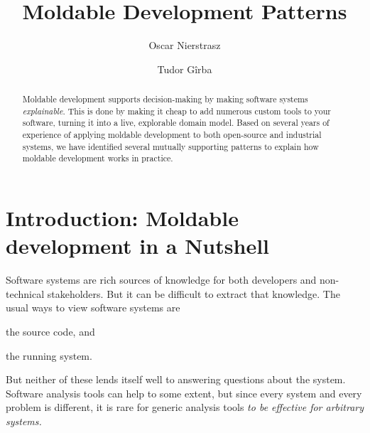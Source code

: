 \documentclass[sigconf]{acmart}
\begin{document}
\title[Moldable Development Patterns --- DRAFT]{Moldable Development Patterns}

\author{Oscar Nierstrasz}

\author{Tudor G\^irba}

\renewcommand{\shortauthors}{Nierstrasz and G\^irba} %

\begin{abstract}
Moldable development supports decision-making by making software systems \emph{explainable}.
This is done by making it cheap to add numerous custom tools to your software, turning it into a live, explorable domain model.
Based on several years of experience of applying moldable development to both open-source and industrial systems, we have identified several mutually supporting patterns to explain how moldable development works in practice.
\end{abstract}


\maketitle

\section{Introduction: Moldable development in a Nutshell}

Software systems are rich sources of knowledge for both developers and non-technical stakeholders.
But it can be difficult to extract that knowledge.
The usual ways to view software systems are
\begin{inparaenum}[(i)]
\item the source code, and
\item the running system.
\end{inparaenum}
But neither of these lends itself well to answering questions about the system.
Software analysis tools can help to some extent, but since every system and every problem is different, it is rare for generic analysis tools \emph{to be effective for arbitrary systems.}
\end{document}
